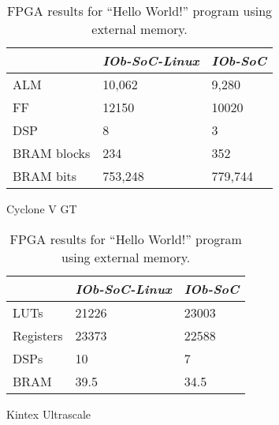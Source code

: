 \begin{table}[!ht]
    \begin{subtable}[h]{0.45\textwidth}
        \centering
        \begin{tabular}{l|l|l|}
            \cline{2-3}
                                              & \textit{IOb-SoC-Linux} & \textit{IOb-SoC} \\ \hline
            \multicolumn{1}{|l|}{ALM}         & 10,062                 & 9,280            \\ \hline
            \multicolumn{1}{|l|}{FF}          & 12150                  & 10020            \\ \hline
            \multicolumn{1}{|l|}{DSP}         & 8                      & 3                \\ \hline
            \multicolumn{1}{|l|}{BRAM blocks} & 234                    & 352              \\ \hline
            \multicolumn{1}{|l|}{BRAM bits}   & 753,248                & 779,744          \\ \hline
        \end{tabular}
       \caption{Cyclone V GT}
       \label{tab:cyclone_hello}
    \end{subtable}
    \hfill
    \begin{subtable}[h]{0.45\textwidth}
        \centering
        \begin{tabular}{l|l|l|}
            \cline{2-3}
                                            & \textit{IOb-SoC-Linux} & \textit{IOb-SoC} \\ \hline
            \multicolumn{1}{|l|}{LUTs}      & 21226                  & 23003            \\ \hline
            \multicolumn{1}{|l|}{Registers} & 23373                  & 22588            \\ \hline
            \multicolumn{1}{|l|}{DSPs}      & 10                     & 7                \\ \hline
            \multicolumn{1}{|l|}{BRAM}      & 39.5                   & 34.5             \\ \hline
        \end{tabular}
        \caption{Kintex Ultrascale}
        \label{tab:kintex_hello}
     \end{subtable}
     \caption{FPGA results for \enquote{Hello World!} program using external memory.}
     \label{tab:fpga_hello}
\end{table}

